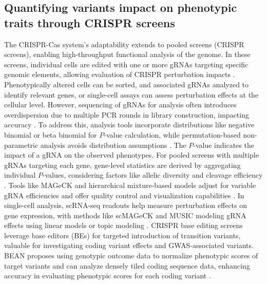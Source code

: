\documentclass[a4paper, titlepage, openright]{book}
\begin{document}
\subsection{Quantifying variants impact on phenotypic traits through CRISPR screens}
The CRISPR-Cas system's adaptability extends to pooled screens (CRISPR screens), enabling high-throughput functional analysis of the genome. In these screens, individual cells are edited with one or more gRNAs targeting specific genomic elements, allowing evaluation of CRISPR perturbation impacts \citep{doench2018ready}. Phenotypically altered cells can be sorted, and associated gRNAs analyzed to identify relevant genes, or single-cell assays can assess perturbation effects at the cellular level. However, sequencing of gRNAs for analysis often introduces overdispersion due to multiple PCR rounds in library construction, impacting accuracy \citep{clement2020technologies}. To address this, analysis tools incorporate distributions like negative binomial or beta binomial for $P$-value calculation, while permutation-based non-parametric analysis avoids distribution assumptions \citep{spahn2017pinapl,jeong2019beta,jia2017permutation}. The $P$-value indicates the impact of a gRNA on the observed phenotypes. For pooled screens with multiple gRNAs targeting each gene, gene-level statistics are derived by aggregating individual $P$-values, considering factors like allelic diversity and cleavage efficiency \citep{li2014mageck,li2015quality,yu2016screenbeam}. Tools like MAGeCK and hierarchical mixture-based models adjust for variable gRNA efficiencies and offer quality control and visualization capabilities \citep{li2015quality,wang2019integrative}. In single-cell analysis, scRNA-seq readouts help measure perturbation effects on gene expression, with methods like scMAGeCK and MUSIC modeling gRNA effects using linear models or topic modeling \citep{yang2020scmageck,duan2019model}. CRISPR base editing screens leverage base editors (BEs) for targeted introduction of transition variants, valuable for investigating coding variant effects and GWAS-associated variants. BEAN proposes using genotypic outcome data to normalize phenotypic scores of target variants and can analyze densely tiled coding sequence data, enhancing accuracy in evaluating phenotypic scores for each coding variant \citep{ryu2023joint}.
\end{document}
